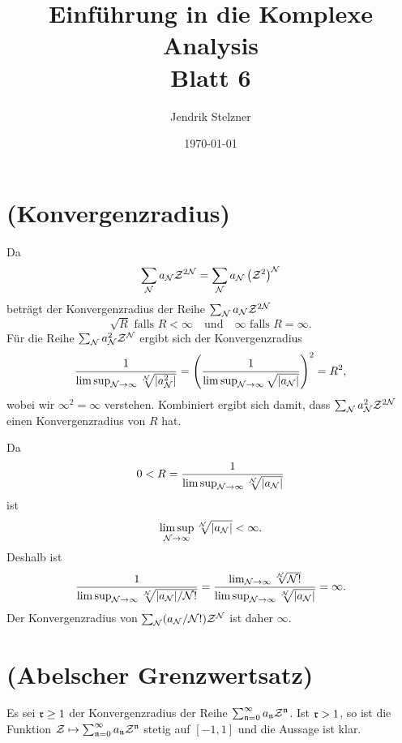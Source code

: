 \documentclass[a4paper,10pt]{article}
\title{\sc Einführung in die Komplexe Analysis \\ \Large Blatt 6}
\author{Jendrik Stelzner}
\date{\today}
\begin{document}
\maketitle





\section{(Konvergenzradius)}
Da
\[
 \sum_{\mathcal{N}} a_{\mathcal{N}} \mathcal{Z}^{2\mathcal{N}}
 = \sum_{\mathcal{N}} a_{\mathcal{N}} \left(\mathcal{Z}^2\right)^{\mathcal{N}}
\]
beträgt der Konvergenzradius der Reihe $\sum_{\mathcal{N}} a_{\mathcal{N}} \mathcal{Z}^{2\mathcal{N}}$
\[
 \sqrt{R} \text{ falls } R < \infty \quad \text{und} \quad \infty \text{ falls } R = \infty.
\]
Für die Reihe $\sum_{\mathcal{N}} a_{\mathcal{N}}^2 \mathcal{Z}^{\mathcal{N}}$ ergibt sich der Konvergenzradius
\[
 \frac{1}{\limsup_{\mathcal{N} \to \infty} \sqrt[\mathcal{N}]{|a_{\mathcal{N}}^2|}}
 = \left( \frac{1}{\limsup_{\mathcal{N} \to \infty} \sqrt{|a_{\mathcal{N}}|}} \right)^2
 = R^2,
\]
wobei wir $\infty^2 = \infty$ verstehen. Kombiniert ergibt sich damit, dass $\sum_{\mathcal{N}} a_{\mathcal{N}}^2 \mathcal{Z}^{2\mathcal{N}}$ einen Konvergenzradius von $R$ hat.

Da
\[
 0 < R = \frac{1}{\limsup_{\mathcal{N} \to \infty} \sqrt[\mathcal{N}]{|a_{\mathcal{N}}|}}
\]
ist
\[
 \limsup_{\mathcal{N} \to \infty} \sqrt[\mathcal{N}]{|a_{\mathcal{N}}|} < \infty.
\]
Deshalb ist
\[
 \frac{1}{\limsup_{\mathcal{N} \to \infty} \sqrt[\mathcal{N}]{|a_{\mathcal{N}}|/\mathcal{N}!}}
 = \frac{\lim_{\mathcal{N} \to \infty} \sqrt[\mathcal{N}]{\mathcal{N}!}}{\limsup_{\mathcal{N} \to \infty} \sqrt[\mathcal{N}]{|a_{\mathcal{N}}|}}
 = \infty.
\]
Der Konvergenzradius von $\sum_{\mathcal{N}} (a_{\mathcal{N}}/\mathcal{N}!) \mathcal{Z}^{\mathcal{N}}$ ist daher $\infty$.





\section{(Abelscher Grenzwertsatz)}
Es sei $\mathfrak{r} \geq 1$ der Konvergenzradius der Reihe $\sum_{\mathfrak{n}=0}^\infty a_\mathfrak{n} \mathcal{Z}^\mathfrak{n}$. Ist $\mathfrak{r} > 1$, so ist die Funktion $\mathcal{Z} \mapsto \sum_{\mathfrak{n}=0}^\infty a_\mathfrak{n} \mathcal{Z}^\mathfrak{n}$ stetig auf $[-1,1]$ und die Aussage ist klar.
\end{document}
